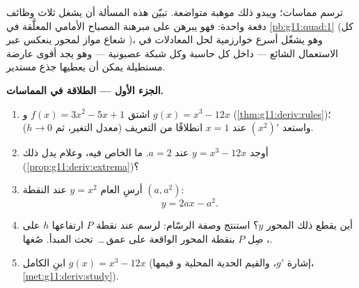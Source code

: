 \begin{problem}
\label{pb:g11:deriv:1}
ترسم  مماسات؛ ويبدو ذلك موهبة متواضعة.
تبيّن هذه المسألة أن  يشغل ثلاث وظائف دفعة واحدة: فهو
يبرهن على مبرهنة المصباح الأمامي المعلَّقة في
\cref{pb:g11:quad:1} (كل شعاع مواز لمحور 
ينعكس عبر )، وهو يشغّل أسرع خوارزمية
لحل المعادلات في الاستعمال الشائع --- داخل كل
حاسبة وكل شبكة عصبونية --- وهو يجد أقوى عارضة
مستطيلة يمكن أن يعطيها جذع مستدير.

\medskip
\noindent\textbf{الجزء الأول --- الطلاقة في المماسات.}
\begin{enumerate}
  \item اشتق $f(x) = 3x^2 - 5x + 1$ و
        $g(x) = x^3 - 12x$
        (\cref{thm:g11:deriv:rules})؛ واستعد $\left(x^2
        \right)'$ عند $x = 1$ انطلاقًا من التعريف (معدل
        التغير، ثم $h \to 0$).
  \item أوجد   $y = x^3 - 12x$ عند $a = 2$. ما
        الخاص فيه، وعلام يدل ذلك
        (\cref{prop:g11:deriv:extrema})؟
  \item أرسِ  العام  $y = x^2$
        عند النقطة $(a, a^2)$:
        \[
        y = 2ax - a^2 .
        \]
  \item أين يقطع ذلك  المحور $y$؟ استنتج
        وصفة الرسّام: لرسم  عند نقطة $P$
        ارتفاعها $h$ على ، صِل $P$ بنقطة
        المحور الواقعة على عمق\,\dots\ تحت المبدأ. صُغها.
  \item ابنِ  الكامل 
        $g(x) = x^3 - 12x$ (إشارة $g'$، والقيم الحدية المحلية و
        قيمها، \cref{met:g11:deriv:study}).
\end{enumerate}


\end{problem}
